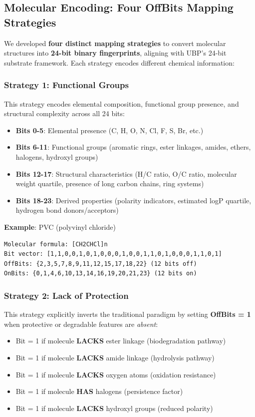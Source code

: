 \documentclass[11pt,letterpaper]{article}
\begin{document}
\subsection{Molecular Encoding: Four OffBits Mapping Strategies}

We developed \textbf{four distinct mapping strategies} to convert molecular structures into \textbf{24-bit binary fingerprints}, aligning with UBP's 24-bit substrate framework. Each strategy encodes different chemical information:

\subsubsection{Strategy 1: Functional Groups}

This strategy encodes elemental composition, functional group presence, and structural complexity across all 24 bits:

\begin{itemize}
    \item \textbf{Bits 0-5}: Elemental presence (C, H, O, N, Cl, F, S, Br, etc.)
    \item \textbf{Bits 6-11}: Functional groups (aromatic rings, ester linkages, amides, ethers, halogens, hydroxyl groups)
    \item \textbf{Bits 12-17}: Structural characteristics (H/C ratio, O/C ratio, molecular weight quartile, presence of long carbon chains, ring systems)
    \item \textbf{Bits 18-23}: Derived properties (polarity indicators, estimated logP quartile, hydrogen bond donors/acceptors)
\end{itemize}

\textbf{Example}: PVC (polyvinyl chloride)
\begin{verbatim}
Molecular formula: [CH2CHCl]n
Bit vector: [1,1,0,0,1,0,1,0,0,0,1,0,0,1,1,0,1,0,0,0,1,1,0,1]
OffBits: {2,3,5,7,8,9,11,12,15,17,18,22} (12 bits off)
OnBits: {0,1,4,6,10,13,14,16,19,20,21,23} (12 bits on)
\end{verbatim}

\subsubsection{Strategy 2: Lack of Protection}

This strategy explicitly inverts the traditional paradigm by setting \textbf{OffBits = 1} when protective or degradable features are \textit{absent}:

\begin{itemize}
    \item Bit = 1 if molecule \textbf{LACKS} ester linkage (biodegradation pathway)
    \item Bit = 1 if molecule \textbf{LACKS} amide linkage (hydrolysis pathway)
    \item Bit = 1 if molecule \textbf{LACKS} oxygen atoms (oxidation resistance)
    \item Bit = 1 if molecule \textbf{HAS} halogens (persistence factor)
    \item Bit = 1 if molecule \textbf{LACKS} hydroxyl groups (reduced polarity)
\end{itemize}
\end{document}
